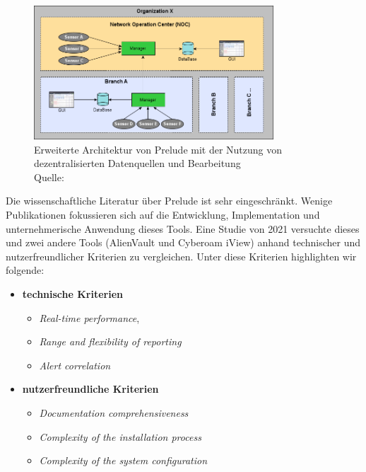 \begin{figure}[H]
   \centering
   \includegraphics[width=0.8\textwidth]{assets/2_p5.png}
   \caption[Erweiterte Architektur von Prelude mit der Nutzung von dezentralisierten Datenquellen und Bearbeitung]
   {Erweiterte Architektur von Prelude mit der Nutzung von dezentralisierten Datenquellen und Bearbeitung\\Quelle: \citep{Prelude_MU} }
   \centering
\end{figure}

Die wissenschaftliche Literatur über Prelude ist sehr eingeschränkt. Wenige Publikationen fokussieren sich auf die Entwicklung, Implementation und unternehmerische Anwendung dieses Tools. Eine Studie von 2021 versuchte dieses und zwei andere Tools (AlienVault und Cyberoam iView) anhand technischer und nutzerfreundlicher Kriterien zu vergleichen. Unter diese Kriterien highlighten wir folgende\citep{Grammatikis_Prelude}: 

\begin{itemize}[noitemsep]
   \item \textbf{technische Kriterien}
   \begin{itemize}[noitemsep]
      \item \textit{Real-time performance}, 
      \item \textit{Range and flexibility of reporting}
      \item \textit{Alert correlation}
   \end{itemize}

   \item \textbf{nutzerfreundliche Kriterien}
   \begin{itemize}[noitemsep]
      \item \textit{Documentation comprehensiveness}
      \item \textit{Complexity of the installation process}
      \item \textit{Complexity of the system configuration}
   \end{itemize}
\end{itemize}

